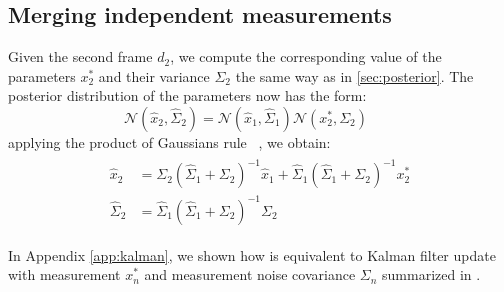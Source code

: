 \subsection{Merging independent measurements} 
\label{sec:combining}

Given the second frame $d_2$, we compute the corresponding value of the parameters $x_2^*$ and their variance $\Sigma_2$ the same way as in \ref{sec:posterior}. The posterior distribution of the parameters now has the form:
% 
\begin{equation}
\mathcal{N}(\hat{x}_2, \hat{\Sigma}_2) = \mathcal{N}(\hat{x}_1, \hat{\Sigma}_1) \mathcal{N}(x_2^*, \Sigma_2) \quad\quad
\end{equation}
% 
applying the product of Gaussians rule ~\cite{petersen2008matrix}, we obtain:
% 
\begin{align}
\begin{split}
\hat{x}_2 &= \Sigma_2 (\hat{\Sigma}_1 + \Sigma_2)^{-1} \hat{x}_1 + 
\hat{\Sigma}_1 (\hat{\Sigma}_1 + \Sigma_2)^{-1} x_2^*
\\
\hat{\Sigma}_2 &= \hat{\Sigma}_1 (\hat{\Sigma}_1 + \Sigma_2)^{-1} \Sigma_2
\label{eq:combining}
\end{split}
\end{align}

In Appendix \ref{app:kalman}, we shown how  is equivalent to Kalman filter update with measurement $x_n^*$ and measurement noise covariance $\Sigma_n$ summarized in .


